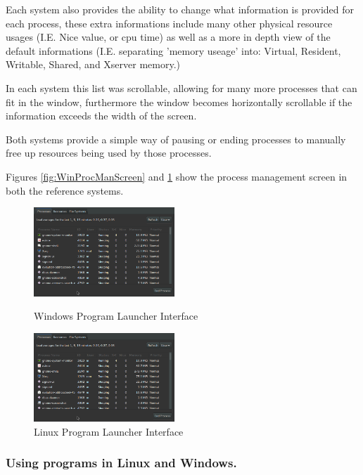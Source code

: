 \documentclass[a4paper]{report}
\begin{document}
Each system also provides the ability to change what information is provided for each process, these extra informations include many other physical resource usages (I.E. Nice value, or cpu time) as well as a more in depth view of the default informations (I.E. separating 'memory useage' into: Virtual, Resident, Writable, Shared, and Xserver memory.)

In each system this list was scrollable, allowing for many more processes that can fit in the window, furthermore the window becomes horizontally scrollable if the information exceeds the width of the screen.

Both systems provide a simple way of pausing or ending processes to manually free up resources being used by those processes.

Figures \ref{fig:WinProcManScreen} and \ref{fig:LinProcManScreen} show the process management screen in both the reference systems.

\begin{figure}[ht]
\centering
\begin{minipage}{.5\textwidth}
  \centering
  \includegraphics[width=200px]{images/Linux_Program_Manager_Screenshot}
  \caption{Windows Program Launcher Interface}
  \label{fig:WinProcManScreen}
\end{minipage}%
\begin{minipage}{.5\textwidth}
  \centering
  \includegraphics[width=200px]{images/Linux_Program_Manager_Screenshot}
  \caption{Linux Program Launcher Interface}
  \label{fig:LinProcManScreen}
\end{minipage} 
\end{figure}


\subsubsection*{Using programs in Linux and Windows.}
\end{document}
